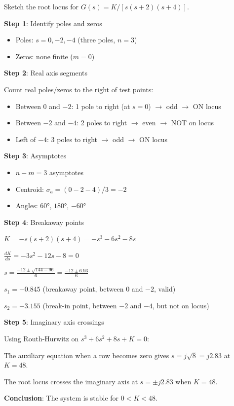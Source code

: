\begin{example}
\label{ex:root_locus_sketch}
Sketch the root locus for $G(s) = K/[s(s+2)(s+4)]$.

\textbf{Step 1}: Identify poles and zeros
\begin{itemize}
    \item Poles: $s = 0, -2, -4$ (three poles, $n = 3$)
    \item Zeros: none finite ($m = 0$)
\end{itemize}

\textbf{Step 2}: Real axis segments

Count real poles/zeros to the right of test points:
\begin{itemize}
    \item Between 0 and $-2$: 1 pole to right (at $s=0$) $\rightarrow$ odd $\rightarrow$ ON locus
    \item Between $-2$ and $-4$: 2 poles to right $\rightarrow$ even $\rightarrow$ NOT on locus
    \item Left of $-4$: 3 poles to right $\rightarrow$ odd $\rightarrow$ ON locus
\end{itemize}

\textbf{Step 3}: Asymptotes
\begin{itemize}
    \item $n - m = 3$ asymptotes
    \item Centroid: $\sigma_a = (0 - 2 - 4)/3 = -2$
    \item Angles: $60°$, $180°$, $-60°$
\end{itemize}

\textbf{Step 4}: Breakaway points

$K = -s(s+2)(s+4) = -s^3 - 6s^2 - 8s$

$\frac{dK}{ds} = -3s^2 - 12s - 8 = 0$

$s = \frac{-12 \pm \sqrt{144 - 96}}{6} = \frac{-12 \pm 6.93}{6}$

$s_1 = -0.845$ (breakaway point, between 0 and $-2$, valid)

$s_2 = -3.155$ (break-in point, between $-2$ and $-4$, but not on locus)

\textbf{Step 5}: Imaginary axis crossings

Using Routh-Hurwitz on $s^3 + 6s^2 + 8s + K = 0$:

The auxiliary equation when a row becomes zero gives $s = j\sqrt{8} = j2.83$ at $K = 48$.

The root locus crosses the imaginary axis at $s = \pm j2.83$ when $K = 48$.

\textbf{Conclusion}: The system is stable for $0 < K < 48$.
\end{example}

